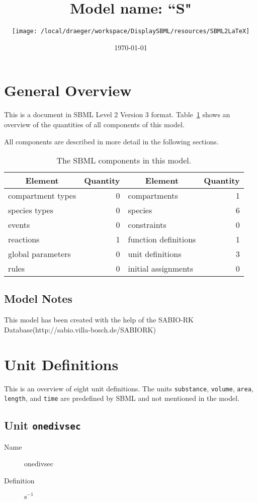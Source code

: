 \documentclass[11pt,twoside,a4paper]{scrartcl}
\title{Model name: ``S"}
\date{\today}
\author{\texttt{[image: /local/draeger/workspace/DisplaySBML/resources/SBML2LaTeX]}}
\begin{document}
\maketitle
\thispagestyle{scrheadings}


\section{General Overview}
This is a document in SBML Level 2 Version 3 format. Table~\ref{tab:components} shows an overview of the quantities of all components of this model.
\begin{table}[h!]
\centering
\caption{The SBML components in this model.}\label{tab:components}
All components are described in more detail in the following sections.
\begin{tabular}{l|r||l|r}
\toprule
\multicolumn{1}{c}{Element}&\multicolumn{1}{|c||}{Quantity}&\multicolumn{1}{c|}{Element}&\multicolumn{1}{c}{Quantity}\\

\midrule
compartment types&0&compartments&1\\
species types&0&species&6\\
events&0&constraints&0\\
reactions&1&function definitions&1\\
global parameters&0&unit definitions&3\\
rules&0&initial assignments&0\\
\bottomrule\end{tabular}
\end{table}

\subsection*{Model Notes}


This model has been created with the help of the SABIO-RK Database(http://sabio.villa-bosch.de/SABIORK)



\section{Unit Definitions}
This is an overview of eight unit definitions.
The units \texttt{substance}, \texttt{volume}, \texttt{area}, \texttt{length}, and \texttt{time} are predefined by SBML and not mentioned in the model.
\subsection{Unit \texttt{onedivsec}}
\begin{description}
\item[Name] onedivsec
\item[Definition] $\mathrm{s}^{-1}$
\end{description}
\end{document}
